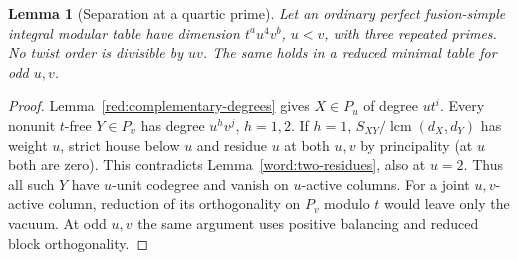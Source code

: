\documentclass[11pt,a4paper]{article}
\numberwithin{equation}{section}
\newtheorem{lemma}[theorem]{Lemma}
\newcommand{\lcm}{\operatorname{lcm}}
\begin{document}
\begin{lemma}[Separation at a quartic prime]\label{red:quartic-separation}
Let an ordinary perfect fusion-simple integral modular table have dimension $t^a u^4v^b$, $u<v$, with three repeated primes. No twist order is divisible by $uv$. The same holds in a reduced minimal table for odd $u,v$.
\end{lemma}
\begin{proof}
Lemma~\ref{red:complementary-degrees} gives $X\in P_u$ of degree $ut^i$. Every nonunit $t$-free $Y\in P_v$ has degree $u^hv^j$, $h=1,2$. If $h=1$, $S_{XY}/\lcm(d_X,d_Y)$ has weight $u$, strict house below $u$ and residue $u$ at both $u,v$ by principality (at $u$ both are zero). This contradicts Lemma~\ref{word:two-residues}, also at $u=2$. Thus all such $Y$ have $u$-unit codegree and vanish on $u$-active columns. For a joint $u,v$-active column, reduction of its orthogonality on $P_v$ modulo $t$ would leave only the vacuum. At odd $u,v$ the same argument uses positive balancing and reduced block orthogonality.
\end{proof}
\end{document}
